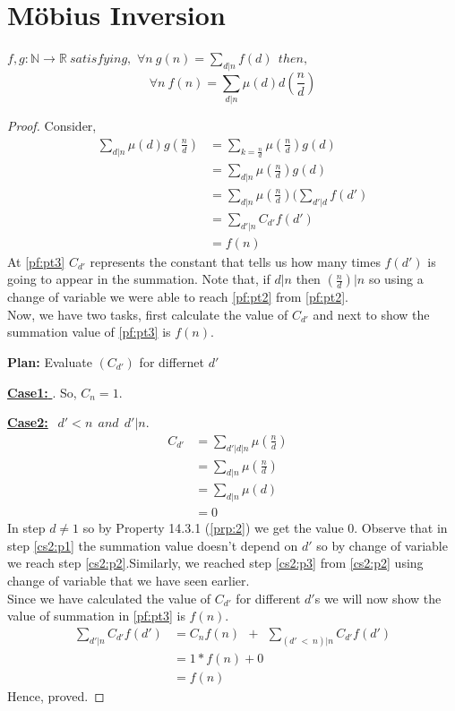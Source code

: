\section{Möbius Inversion} \label{sec:Möbius Inversion}
$f,g:\mathbb{N} \to \mathbb{R} ~satisfying,$ $\forall n ~g(n) = \sum_{d|n} f(d)  ~~then,$  
$$\forall n ~f(n) = \sum_{d|n} \mu(d)d(\frac{n}{d})$$

\begin{proof}
Consider,
\begin{align}
    \sum_{d|n}\mu(d)g(\frac{n}{d}) &= \sum_{k=\frac{n}{d}}\mu(\frac{n}{d})g(d)  \label{pf:pt1}\\
    &= \sum_{d|n}\mu(\frac{n}{d})g(d) \label{pf:pt2} \\
    &=\sum_{d|n}\mu(\frac{n}{d})(\sum_{d'|d}f(d')\label{pf:pt5} \\
    &=\sum_{d'|n}C_{d'}f(d')  \label{pf:pt3}\\
    &=f(n) \label{pf:pt4}
\end{align}
At \ref{pf:pt3} $C_{d'}$ represents the constant that tells us how many times $f(d')$ is going to appear in the summation. Note that, if $d|n$ then $(\frac{n}{d})|n$ so using a change of variable we were able to reach \ref{pf:pt2} from \ref{pf:pt2}. \\
Now, we have two tasks, first calculate the value of $C_{d'}$ and next to show the summation value of \ref{pf:pt3} is $f(n)$.\\
\item {\textbf{Plan:} Evaluate $(C_{d'})$ for differnet $d'$}
\item \underline{\textbf{Case1:} }. So, $C_n=1.$ \\

\item \underline{\textbf{Case2:}} $~~d'<n ~~and~~ d'|n.$
\begin{align} 
    C_{d'} &= \sum_{d'|d|n} \mu(\frac{n}{d}) &\label{cs2:p1}\\
    &= \sum_{d|n}\mu(\frac{n}{d}) &\label{cs2:p2}\\
    &= \sum_{d|n}\mu(d) &\label{cs2:p3}\\
    &= 0 \nonumber
\end{align}
In step  $d \neq 1$ so by Property 14.3.1 (\ref{prp:2}) we get the value 0.
Observe that in step \ref{cs2:p1} the summation value doesn't depend on $d'$ so by change of variable we reach step \ref{cs2:p2}.Similarly, we reached step \ref{cs2:p3}  from \ref{cs2:p2} using change of variable that we have seen earlier.\\
Since we have calculated the value of $C_{d'}$ for different $d'$s  we will now show the value of summation in \ref{pf:pt3} is $f(n)$.
\begin{align}
\sum_{d'|n}C_{d'}f(d') &= C_nf(n)~~+~~\sum_{(d'~<~n)|n}C_{d'}f(d')\nonumber\\
&= 1*f(n) + 0 \nonumber\\
&= f(n) \nonumber
\end{align}
Hence, proved. 
\end{proof}

